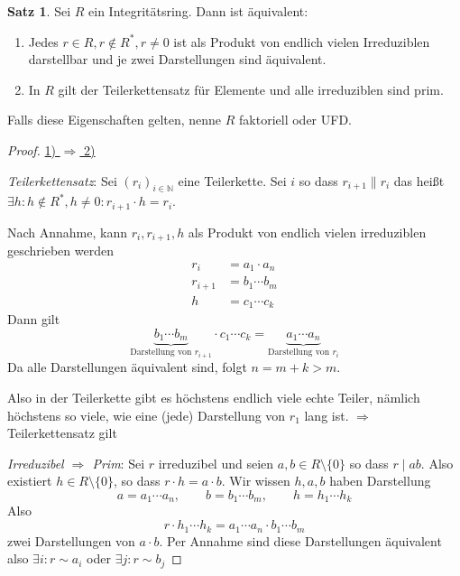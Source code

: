 \documentclass[12pt,parskip=full]{scrartcl}
\newcommand{\setN}{\mathbb{N}}
\newcommand{\heading}{\underline}
\theoremstyle{definition}
\newtheorem{theorem}{Satz}[section]
\theoremstyle{remark}
\begin{document}
	\begin{theorem}
		Sei $R$ ein Integritätsring. Dann ist äquivalent:
		\begin{enumerate}
			\item Jedes $r \in R, r \notin R^*, r \neq 0$ ist als Produkt von endlich vielen Irreduziblen darstellbar und je zwei Darstellungen sind äquivalent.
			\item In $R$ gilt der Teilerkettensatz für Elemente und alle irreduziblen sind prim.
		\end{enumerate}
		Falls diese Eigenschaften gelten, nenne $R$ faktoriell oder UFD.
	\end{theorem}

	\begin{proof}
		\heading{1) $\Rightarrow$ 2)}
		
		\textit{Teilerkettensatz}: Sei $(r_i)_{i \in \setN}$ eine Teilerkette. Sei $i$ so dass $r_{i+1} \parallel r_i$ das heißt $\exists h: h \notin R^*, h \neq 0: r_{i+1} \cdot h = r_i$.
		
		Nach Annahme, kann $r_i, r_{i+1},h$ als Produkt von endlich vielen irreduziblen geschrieben werden
		\begin{align*}
			r_i &= a_1 \cdot a_n \\
			r_{i+1} &= b_1 \cdots b_m \\
			h &= c_1 \cdots c_k
		\end{align*}
		Dann gilt
		\begin{equation*}
			\underbrace{b_1 \cdots b_m}_\text{Darstellung von $r_{i+1}$} \cdot c_1 \cdots c_k = \underbrace{a_1 \cdots a_n}_\text{Darstellung von $r_i$}
		\end{equation*}
		Da alle Darstellungen äquivalent sind, folgt $n = m + k > m$.
		
		Also in der Teilerkette gibt es höchstens endlich viele echte Teiler, nämlich höchstens so viele, wie eine (jede) Darstellung von $r_1$ lang ist. $\Rightarrow$ Teilerkettensatz gilt
		
		\textit{Irreduzibel $\Rightarrow$ Prim}: Sei $r$ irreduzibel und seien $a,b \in R \setminus \{ 0 \}$ so dass $r \mid ab$. Also existiert $h \in R \setminus \{ 0 \}$, so dass $r \cdot h = a \cdot b$. Wir wissen $h,a,b$ haben Darstellung
		\begin{equation*}
			a = a_1 \cdots a_n, \qquad b = b_1 \cdots b_m, \qquad h = h_1 \cdots h_k
		\end{equation*}
		Also
		\begin{equation*}
			r \cdot h_1 \cdots h_k = a_1 \cdots a_n \cdot b_1 \cdots b_m
		\end{equation*}
		zwei Darstellungen von $a \cdot b$. Per Annahme sind diese Darstellungen äquivalent also $\exists i: r \sim a_i$ oder $\exists j: r \sim b_j$
		

\end{proof}
\end{document}
